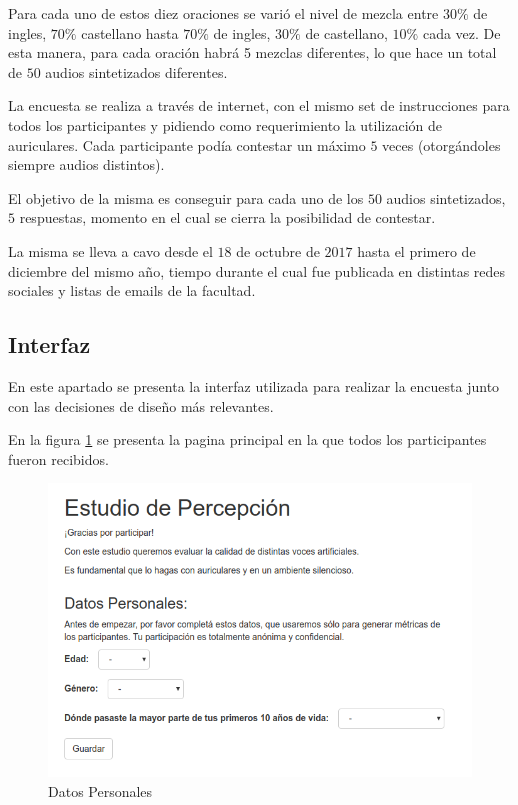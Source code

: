 Para cada uno de estos diez oraciones se varió el nivel de mezcla entre $30\%$ de ingles, $70\%$ castellano hasta $70\%$ de ingles, $30\%$ de castellano, $10\%$ cada vez. De esta manera, para cada oración habrá 5 mezclas diferentes, lo que hace un total de $50$ audios sintetizados diferentes.

La encuesta se realiza a través de internet, con el mismo set de instrucciones para todos los participantes y pidiendo como requerimiento la utilización de auriculares. Cada participante podía contestar un máximo $5$ veces (otorgándoles siempre audios distintos).

El objetivo de la misma es conseguir para cada uno de los $50$ audios sintetizados, $5$ respuestas, momento en el cual se cierra la posibilidad de contestar.

La misma se lleva a cavo desde el $18$ de octubre de $2017$ hasta el primero de diciembre del mismo año, tiempo durante el cual fue publicada en distintas redes sociales y listas de emails de la facultad.

\subsection{Interfaz}

En este apartado se presenta la interfaz utilizada para realizar la encuesta junto con las decisiones de diseño más relevantes. 

En la figura \ref{personalData} se presenta la pagina principal en la que todos los participantes fueron recibidos.

\begin{figure}[htp]
\begin{center}
\includegraphics[scale=0.6]{estudio_online/estudio1.png}
\end{center}
\caption{Datos Personales}
\label{personalData}
\end{figure}

